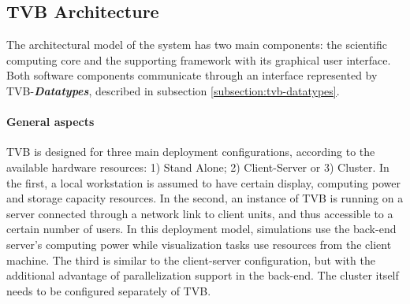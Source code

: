 \documentclass{bioinfo}
\newcommand*{\tvbdatatype}[1]{\textbf{\emph{#1}}}   %
\begin{document}
    
\begin{methods}

\section{TVB Architecture}
    The architectural model of the system has two main
    components: the  scientific computing core and the supporting framework
    with its graphical user interface. Both software components communicate
    through an interface  represented by TVB-\tvbdatatype{Datatypes},
     described in subsection \ref{subsection:tvb-datatypes}. 
    
    \paragraph*{General aspects} TVB is designed for three main deployment
    configurations, according to the available hardware resources:  1) Stand
    Alone;  2) Client-Server or 3) Cluster. In the first, a local  workstation
    is assumed to have certain display, computing power and storage capacity
    resources. In the second, an instance of TVB is running on a server
    connected through a network link to client units, and thus accessible to a
    certain number of users. In this deployment model, simulations use the
    back-end server's computing power while visualization tasks use resources
    from the client machine. The third is similar to the client-server
    configuration, but with the additional advantage of parallelization
    support in the back-end. The cluster itself needs to be configured
    separately of TVB.
    

\end{methods}
\end{document}
